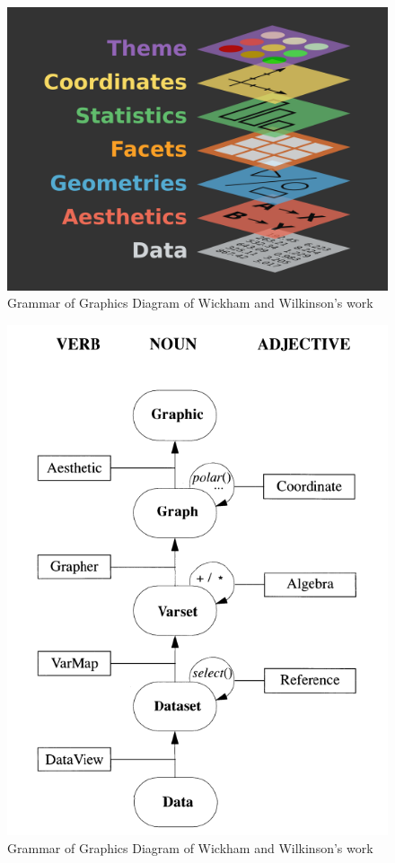 \documentclass[print]{nuthesis}
\begin{document}
\begin{figure}

{\centering \includegraphics[width=0.45\linewidth]{figure/gglayers} 

}

\caption{Grammar of Graphics Diagram of Wickham and Wilkinson's work}\label{fig:unnamed-chunk-2-1}
\end{figure}
\begin{figure}

{\centering \includegraphics[width=0.45\linewidth]{figure/graphic-flowchart} 

}

\caption{Grammar of Graphics Diagram of Wickham and Wilkinson's work}\label{fig:unnamed-chunk-2-2}
\end{figure}
\end{document}
